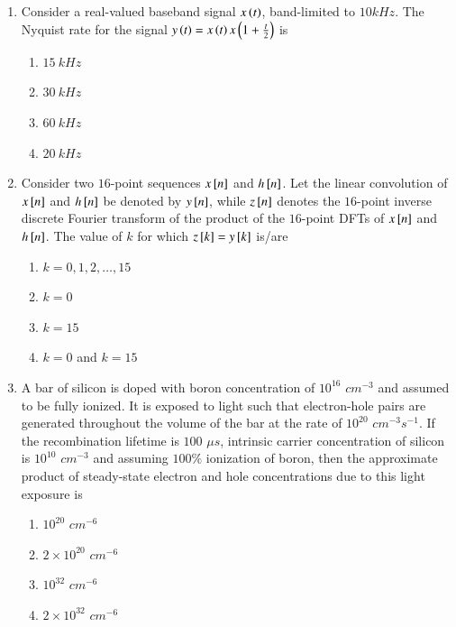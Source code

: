 \documentclass[journal,12pt,onecolumn]{IEEEtran}
\theoremstyle{remark}
\begin{document}
\begin{enumerate}
\item Consider a real-valued baseband signal $x\left(t\right)$, band-limited to $10 kHz$. The Nyquist rate for the signal $y\left(t\right) = x\left(t\right)  x\left(1 + \frac{t}{2}\right)$ is
\begin{multicols}{2}
\begin{enumerate}
\item $15 \ kHz$
\item $30 \ kHz$
\item $60 \ kHz$
\item $20 \ kHz$
\end{enumerate}
\end{multicols}
\hfill {}

\item Consider two $16$-point sequences $x{}\left[n\right]$ and $h{}\left[n\right]$. Let the linear convolution of $x{}\left[n\right]$ and $h{}\left[n\right]$ be denoted by $y{}\left[n\right]$, while $z{}\left[n\right]$ denotes the $16$-point inverse discrete Fourier transform  of the product of the $16$-point DFTs of $x{}\left[n\right]$ and $h{}\left[n\right]$. The value of $k$ for which $z{}\left[k\right] = y{}\left[k\right]$ is/are
\begin{multicols}{4}
\begin{enumerate}
\item $k = 0, 1, 2, \dots, 15$
\item $k = 0$
\item $k = 15$
\item $k = 0$ and $k = 15$
\end{enumerate}
\end{multicols}
\hfill {}

\item A bar of silicon is doped with boron concentration of $10^{16}$ $cm^{-3}$ and assumed to be fully ionized. It is exposed to light such that electron-hole pairs are generated throughout the volume of the bar at the rate of $10^{20}$ $cm^{-3}s^{-1}$. If the recombination lifetime is $100$ $\mu s$, intrinsic carrier concentration of silicon is $10^{10}$ $cm^{-3}$ and assuming $100\%$ ionization of boron, then the approximate product of steady-state electron and hole concentrations due to this light exposure is
\begin{multicols}{4}
\begin{enumerate}
\item $10^{20}$ $cm^{-6}$
\item $2 \times 10^{20}$ $cm^{-6}$
\item $10^{32}$ $cm^{-6}$
\item $2 \times 10^{32}$ $cm^{-6}$
\end{enumerate}
\end{multicols}
\hfill {}


\end{enumerate}
\end{document}
